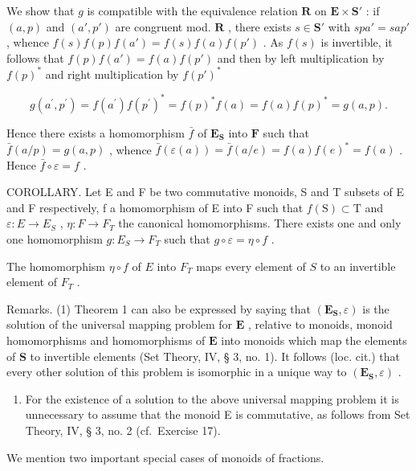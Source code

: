 We show that \(g\) is compatible with the equivalence relation \(\mathbf{R}\) on \(\mathbf{E} \times \mathbf{S}'\) : if \((a, p)\) and \((a', p')\) are congruent mod. \(\mathbf{R}\) , there exists \(s \in \mathbf{S}'\) with \(spa' = sap'\) , whence \(f(s)f(p)f(a') = f(s)f(a)f(p')\) . As \(f(s)\) is invertible, it follows that \(f(p)f(a') = f(a)f(p')\) and then by left multiplication by \(f(p)^*\) and right multiplication by \(f(p')^*\)

\[
g (a ^ {\prime}, p ^ {\prime}) = f (a ^ {\prime}) f (p ^ {\prime}) ^ {*} = f (p) ^ {*} f (a) = f (a) f (p) ^ {*} = g (a, p).
\]

Hence there exists a homomorphism \(\bar{f}\) of \(\mathbf{E}_{\mathbf{S}}\) into \(\mathbf{F}\) such that \(\bar{f}(a/p) = g(a,p)\) , whence \(\bar{f}(\varepsilon(a)) = \bar{f}(a/e) = f(a)f(e)^* = f(a)\) . Hence \(\bar{f} \circ \varepsilon = f\) .

COROLLARY. Let E and F be two commutative monoids, S and T subsets of E and F respectively, f a homomorphism of E into F such that \(f(\mathrm{S}) \subset \mathrm{T}\) and \(\varepsilon: E \to E_{S}\) , \(\eta: F \to F_{T}\) the canonical homomorphisms. There exists one and only one homomorphism \(g: E_{S} \to F_{T}\) such that \(g \circ \varepsilon = \eta \circ f\) .

The homomorphism \(\eta \circ f\) of \(E\) into \(F_{T}\) maps every element of \(S\) to an invertible element of \(F_{T}\) .

Remarks. (1) Theorem 1 can also be expressed by saying that \((\mathbf{E}_{\mathbf{S}},\varepsilon)\) is the solution of the universal mapping problem for \(\mathbf{E}\) , relative to monoids, monoid homomorphisms and homomorphisms of \(\mathbf{E}\) into monoids which map the elements of \(\mathbf{S}\) to invertible elements (Set Theory, IV, § 3, no. 1). It follows (loc. cit.) that every other solution of this problem is isomorphic in a unique way to \((\mathbf{E}_{\mathbf{S}},\varepsilon)\) .

\begin{enumerate}
\def\labelenumi{(\arabic{enumi})}
\setcounter{enumi}{1}
\tightlist
\item
  For the existence of a solution to the above universal mapping problem it is unnecessary to assume that the monoid E is commutative, as follows from Set Theory, IV, § 3, no. 2 (cf.~Exercise 17).
\end{enumerate}

We mention two important special cases of monoids of fractions.


